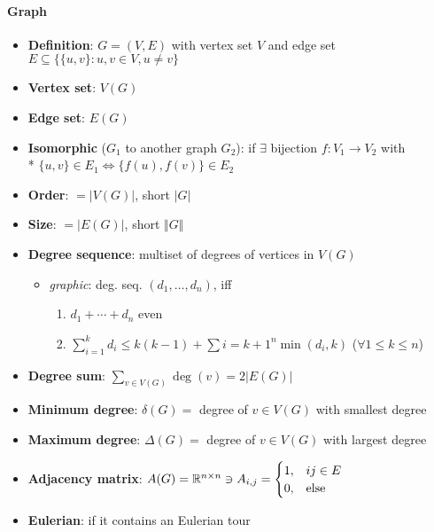 \paragraph{Graph}
\begin{itemize}
  \item \textbf{Definition}: $ G = (V,E) $ with vertex set $ V $ and edge set $ E \subseteq \{ \{ u,v \} : u,v \in V, u \neq v \} $
  \item \textbf{Vertex set}: $ V(G) $
  \item \textbf{Edge set}: $ E(G) $
  \item \textbf{Isomorphic} ($ G_1 $ to another graph $ G_2 $): if $ \exists $ bijection $ f: V_1 \to V_2 $ with \\*
    $ \{ u,v \} \in E_1 \Leftrightarrow \{ f(u),f(v) \} \in E_2 $
  \item \textbf{Order}: $ = \vert V(G) \vert $, short $ \vert G \vert $
  \item \textbf{Size}: $ = \vert E(G) \vert $, short $ \Vert G \Vert $
  \item \textbf{Degree sequence}: multiset of degrees of vertices in $ V(G) $
  \begin{itemize}
    \item \emph{graphic}: deg. seq. $ (d_1, \dots, d_n) $, iff
    \begin{enumerate}
       \item $ d_1 + \cdots + d_n $ even
       \item $ \sum_{i=1}^k d_i \leq k(k-1) + \sum{i = k+1}^n \min(d_i,k) $ \quad ($ \forall 1 \leq k \leq n $)
     \end{enumerate} 
  \end{itemize}
  \item \textbf{Degree sum}: $ \sum_{v \in V(G)} \deg(v) = 2\vert E(G) \vert $
  \item \textbf{Minimum degree}: $ \delta(G) = $ degree of $ v \in V(G) $ with smallest degree
  \item \textbf{Maximum degree}: $ \Delta(G) = $ degree of $ v \in V(G) $ with largest degree
  \item \textbf{Adjacency matrix}: $ A(G) = \mathbb{R}^{n \times n} \ni A_{i,j} = \begin{cases}
    1, & ij \in E \\
    0, & \text{else}
  \end{cases} $
  \item \textbf{Eulerian}: if it contains an Eulerian tour
\end{itemize}

